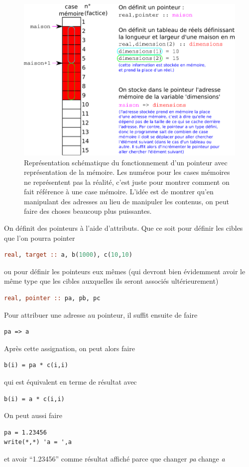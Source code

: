 \documentclass[a4paper,twoside]{article}
\begin{document}
\begin{figure}[htb]
\centering
\includegraphics[width=0.65\linewidth]{figure/pointeurs.pdf}
\caption{Représentation schématique du fonctionnement d'un pointeur avec représentation de la mémoire. Les numéros pour les cases mémoires ne représentent pas la réalité, c'est juste pour montrer comment on fait référence à une case mémoire. L'idée est de montrer qu'en manipulant des adresses au lieu de manipuler les contenus, on peut faire des choses beaucoup plus puissantes.}
\end{figure}

On définit des pointeurs à l'aide d'attributs. Que ce soit pour définir les cibles que l'on pourra pointer
\begin{lstlisting}[language=Fortran]
real, target :: a, b(1000), c(10,10)
\end{lstlisting}
ou pour définir les pointeurs eux mêmes (qui devront bien évidemment avoir le même type que les cibles auxquelles ils seront associés ultérieurement)
\begin{lstlisting}[language=Fortran]
real, pointer :: pa, pb, pc
\end{lstlisting}

Pour attribuer une adresse au pointeur, il suffit ensuite de faire
\begin{verbatim}
pa => a
\end{verbatim}

Après cette assignation, on peut alors faire 
\begin{verbatim}
b(i) = pa * c(i,i)
\end{verbatim}
qui est équivalent en terme de résultat avec
\begin{verbatim}
b(i) = a * c(i,i)
\end{verbatim}

\bigskip

On peut aussi faire 
\begin{verbatim}
pa = 1.23456
write(*,*) 'a = ',a
\end{verbatim}
et avoir ``1.23456'' comme résultat affiché parce que changer \textit{pa} change \textit{a}
\end{document}
